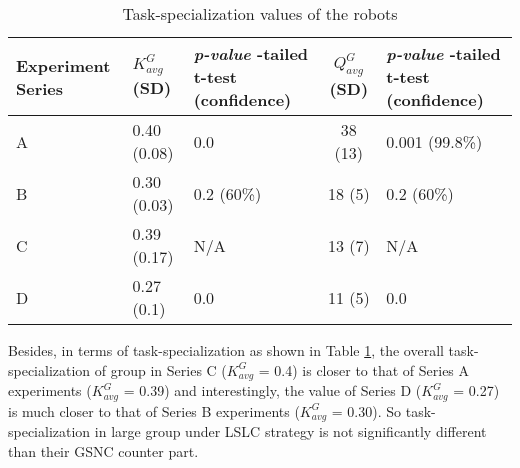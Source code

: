 \documentclass[journal]{IEEEtran}
\begin{document}
\begin{table}[H]
\begin{center}
\caption{Task-specialization values of the robots}
\begin{tabular}{|p{0.7in}|p{0.7in}|p{0.7in}|c|p{0.7in}|}
\hline Experiment \protect\newline Series & $ K^G_{avg}$ (SD) & \textit{ p-value} \protect\newline 1-tailed t-test (confidence)  & $ Q^G_{avg}$ (SD) & \textit{ p-value} \protect\newline 1-tailed t-test \protect\newline (confidence) \\ 
\hline A & 0.40 (0.08)& 0.0 & 38 (13) & 0.001 (99.8\%)\\ 
\hline B &  0.30 (0.03) & 0.2 (60\%) &  18 (5) & 0.2 (60\%)\\
\hline C  & 0.39 (0.17) & N/A & 13 (7) & N/A \\
\hline D  & 0.27 (0.1)& 0.0 & 11 (5) & 0.0\\
\hline
\end{tabular}
\label{table:k-cmp} 
\end{center}
\end{table}
Besides, in terms of task-specialization as shown in Table \ref{table:k-cmp}, the overall task-specialization of group in Series C ($K^G_{avg}$ = 0.4) is  closer to that of Series A experiments ($K^G_{avg}$ = 0.39) and interestingly, the value of  Series D ($K^G_{avg}$ = 0.27) is  much closer to that of Series B experiments ($K^G_{avg}$ = 0.30). So task-specialization in large group under LSLC strategy is not significantly different than their GSNC counter part. %
\end{document}
